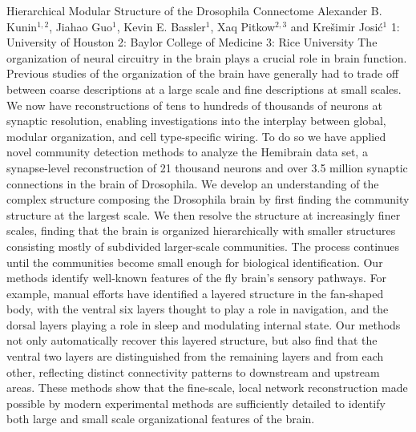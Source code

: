 \vspace{1.5ex}
\abs
{Hierarchical Modular Structure of the Drosophila Connectome}
{Alexander B. Kunin$^{1,2}$, Jiahao Guo$^{1}$, Kevin E. Bassler$^{1}$, Xaq Pitkow$^{2,3}$ and Krešimir Josić$^{1}$ }
{1: University of Houston 2: Baylor College of Medicine 3: Rice University}
{The organization of neural circuitry in the brain plays a crucial role in brain function. Previous studies of the organization of the brain have generally had to trade off between coarse descriptions at a large scale and fine descriptions at small scales. We now have reconstructions of tens to hundreds of thousands of neurons at synaptic resolution, enabling investigations into the interplay between global, modular organization, and cell type-specific wiring. To do so we have applied novel community detection methods to analyze the Hemibrain data set, a synapse-level reconstruction of 21 thousand neurons and over 3.5 million synaptic connections in the brain of Drosophila. We develop an understanding of the complex structure composing the Drosophila brain by first finding the community structure at the largest scale. We then resolve the structure at increasingly finer scales, finding that the brain is organized hierarchically with smaller structures consisting mostly of subdivided larger-scale communities. The process continues until the communities become small enough for biological identification. Our methods identify well-known features of the fly brain's sensory pathways. For example, manual efforts have identified a layered structure in the fan-shaped body, with the ventral six layers thought to play a role in navigation, and the dorsal layers playing a role in sleep and modulating internal state. Our methods not only automatically recover this layered structure, but also find that the ventral two layers are distinguished from the remaining layers and from each other, reflecting distinct connectivity patterns to downstream and upstream areas. These methods show that the fine-scale, local network reconstruction made possible by modern experimental methods are sufficiently detailed to identify both large and small scale organizational features of the brain.}


